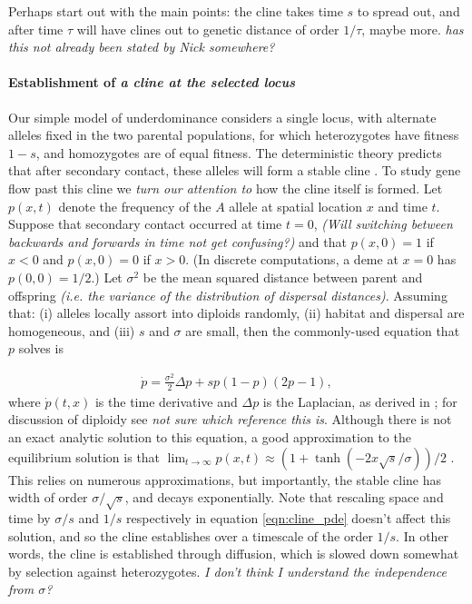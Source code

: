 \documentclass[12pt]{article}
\newcommand{\alisa}[1]{{\em \color{red} #1}}
\begin{document}
Perhaps start out with the main points:
the cline takes time $s$ to spread out,
and after time $\tau$ will have clines out to genetic distance of order $1/\tau$,
maybe more. \alisa{has this not already been stated by Nick somewhere?}

\paragraph{Establishment of  \alisa{a cline at the selected locus}}
Our simple model of underdominance considers a single locus, with alternate alleles fixed in the two parental populations,
for which heterozygotes have fitness $1-s$, and homozygotes are of equal fitness.
The deterministic theory predicts that after secondary contact,
these alleles will form a stable cline \citep{Barton1979}.
To study gene flow past this cline we \alisa{turn our attention to} how the cline itself is formed.
Let $p(x,t)$ denote the frequency of the $A$ allele at spatial location $x$ and time $t$.  
Suppose that secondary contact occurred at time $t=0$, \alisa{(Will switching between backwards and forwards in time not get confusing?)}
and that $p(x,0) = 1$ if $x<0$ and $p(x,0)=0$ if $x>0$.
(In discrete computations, a deme at $x=0$ has $p(0,0)=1/2$.)
Let $\sigma^2$ be the mean squared distance between parent and offspring \alisa{(i.e. the variance of the distribution of dispersal distances)}.
Assuming that: (i) alleles locally assort into diploids randomly, (ii) habitat and dispersal are homogeneous, and (iii) $s$ and $\sigma$ are small, then the commonly-used equation that $p$ solves is

\begin{align} \label{eqn:cline_pde}
    \dot p = \frac{\sigma^2}{2} \Delta p + s p (1-p) (2p-1) ,
\end{align}
where $\dot p(t,x)$ is the time derivative and $\Delta p$ is the Laplacian,
as derived in \citep{Bazykin1969}; for discussion of diploidy see \citep{diploidcline} \alisa{not sure which reference this is}.
Although there is not an exact analytic solution to this equation, a good approximation to the equilibrium solution is that
$\lim_{t \to \infty} p(x,t) \approx (1+\tanh(-2x\sqrt{s}/\sigma))/2$ \citep{Bazykin1969}. This relies on numerous approximations, but importantly, the stable cline has width of order $\sigma/\sqrt{s}$,
and decays exponentially. Note that rescaling space and time by $\sigma/s$ and $1/s$ respectively in equation \eqref{eqn:cline_pde} doesn't affect this solution, and so the cline establishes over a timescale of the order $1/s$. In other words, the cline is established through diffusion, which is slowed down somewhat by selection against heterozygotes. \alisa{I don't think I understand the independence from $\sigma$?}
\end{document}
